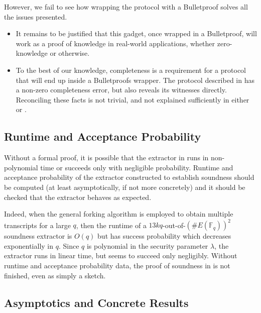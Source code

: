 \documentclass{article}
\theoremstyle{definition}
\newcommand{\6}{\mathbf}
\newcommand{\7}{\mathcal}
\newcommand{\free}[1]{{\textcolor{red}{#1}}}
\begin{document}
    
    However, we fail to see how wrapping the protocol with a Bulletproof solves all the issues presented. 
    \begin{itemize}
    \item It remains to be justified that this gadget, once wrapped in a Bulletproof, will work as a proof of knowledge in real-world applications, whether zero-knowledge or otherwise.
    \item To the best of our knowledge, completeness is a requirement for a protocol that will end up inside a Bulletproofs wrapper. The protocol described in \cite{BassaSoundnessIPDL} has a non-zero completeness error, but also reveals its witnesses directly. Reconciling these facts is not trivial, and not explained sufficiently in either \cite{BassaSoundnessIPDL} or \cite{Eagen22}.
    \end{itemize}

    \subsection{Runtime and Acceptance Probability}\label{sec:runtime}

    Without a formal proof, it is possible that the extractor in \cite{BassaSoundnessIPDL} runs in non-polynomial time or succeeds only with negligible probability.  Runtime and acceptance probability of the extractor constructed to establish soundness should be computed (at least asymptotically, if not more concretely) and it should be checked that the extractor behaves as expected. 
    \smallskip
    
    Indeed, when the general forking algorithm is employed to obtain multiple transcripts for a large $q$, then the runtime of a $13kq$-out-of-$\left(\#E(\mathbb{F}_q)\right)^2$ soundness extractor is $O(q)$ but has success probability which decreases exponentially in $q$. Since $q$ is polynomial in the security parameter $\lambda$,  the extractor runs in linear time, but seems to succeed only negligibly. Without runtime and acceptance probability data, the proof of soundness in \cite{BassaSoundnessIPDL} is not finished, even as simply a sketch.

    \subsection{Asymptotics and Concrete Results}\label{sec:asymptotics}
    
\end{document}
